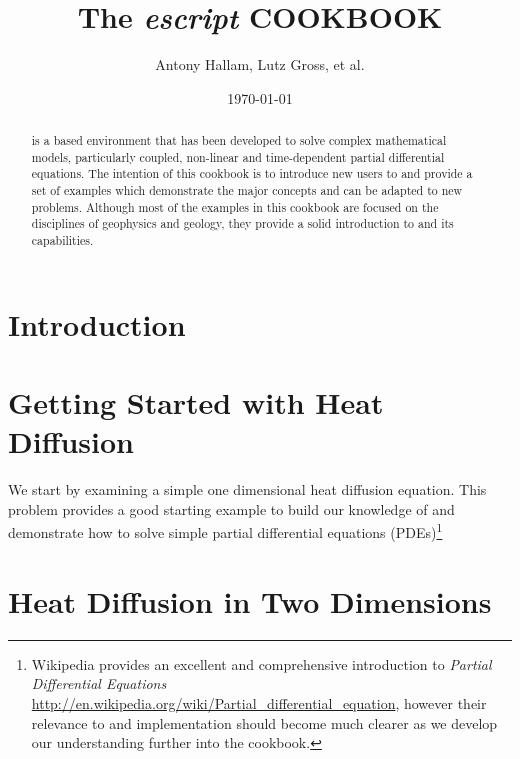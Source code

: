 \documentclass{esysdoc}
\title{The \textit{escript} COOKBOOK}
\author{Antony Hallam, Lutz Gross, et al.}
\date{\today}
\begin{document}
\maketitle

\ifpdf
{}
\fi



\begin{abstract}
\esc is a \pyt based environment that has been developed to solve complex mathematical models, particularly coupled, non-linear and time-dependent partial differential equations. The intention of this cookbook is to introduce new users to \esc and provide a set of examples which demonstrate the major concepts and can be adapted to new problems. Although most of the examples in this cookbook are focused on the disciplines of geophysics and geology, they provide a solid introduction to \esc and its capabilities.
\end{abstract}


\cleardoublepage{}%
\tableofcontents

\newpage

\chapter{Introduction}
 \label{CHAP INTRO}
 
\chapter{Getting Started with Heat Diffusion}
 \label{CHAP HEAT DIFF}
 We start by examining a simple one dimensional heat diffusion equation. This
 problem provides a good starting example to build our knowledge of \esc and
 demonstrate how to solve simple partial differential equations
 (PDEs)\footnote{Wikipedia provides an excellent and comprehensive
 introduction to \textit{Partial Differential Equations}
 \url{http://en.wikipedia.org/wiki/Partial_differential_equation}, however
 their relevance to \esc and implementation should become much clearer as we
 develop our understanding further into the cookbook.}
 
 
\chapter{Heat Diffusion in Two Dimensions}
 \label{CHAP HEAT 2a}
 
\end{document}
